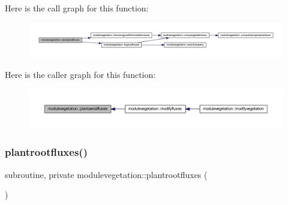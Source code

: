 Here is the call graph for this function\+:\nopagebreak
\begin{figure}[H]
\begin{center}
\leavevmode
\includegraphics[width=350pt]{namespacemodulevegetation_a99cb73f235c051753d3cc48f59f56eae_cgraph}
\end{center}
\end{figure}
Here is the caller graph for this function\+:\nopagebreak
\begin{figure}[H]
\begin{center}
\leavevmode
\includegraphics[width=350pt]{namespacemodulevegetation_a99cb73f235c051753d3cc48f59f56eae_icgraph}
\end{center}
\end{figure}
\mbox{\label{namespacemodulevegetation_abcc76339f35e9a70675847ad459a843c}} 
\subsubsection{\texorpdfstring{plantrootfluxes()}{plantrootfluxes()}}
{\footnotesize\ttfamily subroutine, private modulevegetation\+::plantrootfluxes (\begin{DoxyParamCaption}{ }\end{DoxyParamCaption})\hspace{0.3cm}{\ttfamily [private]}}

